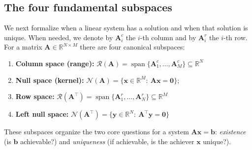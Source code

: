\subsection{The four fundamental subspaces}
We next formalize when a linear system has a solution and when that solution is unique. When needed, we denote by $\mathbf{A}_i^c$ the $i$-th column and by $\mathbf{A}_i^r$ the $i$-th row.
For a matrix $\mathbf{A}\in\mathbb{R}^{N\times M}$ there are four canonical subspaces:
\begin{enumerate}
    \item \textbf{Column space (range):} $\displaystyle \mathcal{R}(\mathbf{A})=\operatorname{span}\{\mathbf{A}_1^c,\dots,\mathbf{A}_M^c\}\subseteq\mathbb{R}^N$
    \item \textbf{Null space (kernel):} $\displaystyle \mathcal{N}(\mathbf{A})=\{\mathbf{x}\in\mathbb{R}^M:\ \mathbf{A}\mathbf{x}=\mathbf{0}\}$;
    \item \textbf{Row space:} $\displaystyle \mathcal{R}(\mathbf{A}^{\top})=\operatorname{span}\{\mathbf{A}_1^r,\dots,\mathbf{A}_N^r\}\subseteq\mathbb{R}^M$
    \item \textbf{Left null space:} $\displaystyle \mathcal{N}(\mathbf{A}^{\top})=\{\mathbf{y}\in\mathbb{R}^N:\ \mathbf{A}^{\top}\mathbf{y}=\mathbf{0}\}$
\end{enumerate}
These subspaces organize the two core questions for a system $\mathbf{A}\mathbf{x}=\mathbf{b}$: \emph{existence} (is $\mathbf{b}$ achievable?) and \emph{uniqueness} (if achievable, is the achiever $\mathbf{x}$ unique?). 

